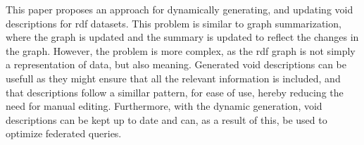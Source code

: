 This paper proposes an approach for dynamically generating, and updating \gls{void} descriptions for \gls{rdf} datasets. This problem is similar to graph summarization, where the graph is updated and the summary is updated to reflect the changes in the graph. However, the problem is more complex, as the \gls{rdf} graph is not simply a representation of data, but also meaning. Generated \gls{void} descriptions can be usefull as they might ensure that all the relevant information is included, and that descriptions follow a simillar pattern, for ease of use, hereby reducing the need for manual editing. Furthermore, with the dynamic generation, \gls{void} descriptions can be kept up to date and can, as a result of this, be used to optimize federated queries.






